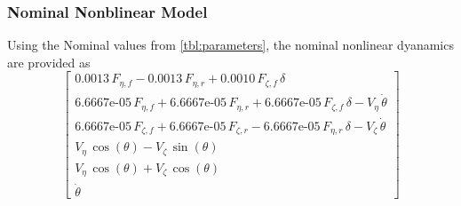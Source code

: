 \documentclass[conference, onecolumn]{IEEEtran}
\begin{document}
\subsubsection{Nominal Nonblinear Model}
Using the Nominal values from \tablename{\ref{tbl:parameters}}, the nominal nonlinear dyanamics are provided as \[
    \left\lbrack \begin{array}{c}
        0.0013\,F_{\eta ,f} -0.0013\,F_{\eta ,r} +0.0010\,F_{\zeta ,f} \,\delta \\
        \text{6.6667e-05}\,F_{\eta ,f} +\text{6.6667e-05}\,F_{\eta ,r} +\text{6.6667e-05}\,F_{\zeta ,f} \,\delta -V_{\eta } \,\dot{\theta} \\
        \text{6.6667e-05}\,F_{\zeta ,f} +\text{6.6667e-05}\,F_{\zeta ,r} -\text{6.6667e-05}\,F_{\eta ,r} \,\delta -V_{\zeta } \,\dot{\theta} \\
        V_{\eta } \,\cos \left(\theta \right)-V_{\zeta } \,\sin \left(\theta \right)\\
        V_{\eta } \,\cos \left(\theta \right)+V_{\zeta } \,\cos \left(\theta \right)\\
        \dot{\theta} 
    \end{array}\right\rbrack
\]
\end{document}
